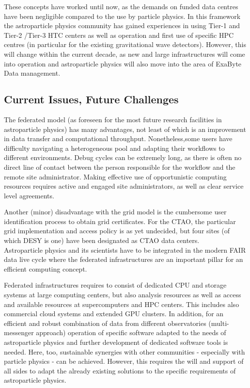 These concepts have worked until now, as the demands on funded data centres have been negligible compared to the use by particle physics.
In this framework the astroparticle physics community has gained experiences in using Tier-1 and Tier-2 /Tier-3 HTC centers as well as operation and first use of specific HPC centres (in particular for the existing gravitational wave detectors).
However, this will change within the current decade, as new and large infrastructures will come into operation and astroparticle physics will also move into the area of ExaByte Data management.


\subsection{Current Issues, Future Challenges}

The federated model (as foreseen for the most future research facilities in astroparticle physics) has many advantages, not least of which is an
improvement in data transfer and computational throughput. 
Nonetheless,some users have difficulty navigating a heterogeneous pool and adapting their workflows to different environments. 
Debug cycles can be extremely long, as there is often no direct line of contact between the person responsible for the workflow and the remote site administrator. 
Making effective use of opportunistic computing resources requires active and engaged site administrators, as well as clear service level agreements.

Another (minor) disadvantage with the grid model is the cumbersome user
identification process to obtain grid certificates. For the CTAO, the
particular grid implementation and access policy is as yet undecided, but
four sites (of which DESY is one) have been designated as CTAO data
centers. \\

Astroparticle physics and its scientists have to be integrated in the modern FAIR data live cycle where the federated infrastructures are an important pillar for an efficient computing concept.

Federated infrastructures requires to consist of dedicated CPU
and storage systems at large computing centers, but also analysis
resources as well as access and  available
resources at supercomputers and HPC centers.
This includes also commercial cloud systems and extended GPU clusters.
In addition, for an efficient and robust combination of data from different observatories (multi-messenger approach) operation
of specific software adapted to the needs of astroparticle physics and further development of dedicated software tools is needed.
Here, too, sustainable synergies with other communities - especially with particle physics - can be achieved. However, this requires the will and support of all sides to adapt the already existing solutions to the specific requirements of astroparticle physics. 



